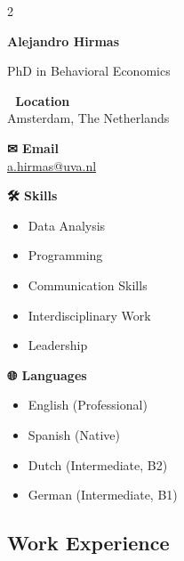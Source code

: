 \documentclass[11pt,a4paper]{article}
\begin{document}
\begin{paracol}{2}
\setlength{\columnsep}{1.5cm}

\begin{leftcolumn}
\textbf{\LARGE Alejandro Hirmas}

\vspace{0.5em}
PhD in Behavioral Economics

\vspace{1em}
\textbf{📍 Location} \\
Amsterdam, The Netherlands

\vspace{0.5em}
\textbf{✉ Email} \\
\href{mailto:a.hirmas@uva.nl}{a.hirmas@uva.nl}

\vspace{1em}
\textbf{🛠 Skills}
\begin{itemize}
  \item Data Analysis
  \item Programming
  \item Communication Skills
  \item Interdisciplinary Work
  \item Leadership
\end{itemize}

\vspace{0.5em}
\textbf{🌐 Languages}
\begin{itemize}
  \item English (Professional)
  \item Spanish (Native)
  \item Dutch (Intermediate, B2)
  \item German (Intermediate, B1)
\end{itemize}

\end{leftcolumn}

\begin{rightcolumn}

\section*{Work Experience}


\end{rightcolumn}
\end{paracol}
\end{document}
